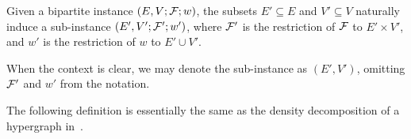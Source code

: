 

\begin{definition}
Given a bipartite instance $(E, V; \mathcal {F}; w)$, the subsets $E' \subseteq E$ and $V' \subseteq V$ naturally induce a sub-instance $(E', V'; \mathcal {F}'; w')$, where $\mathcal {F}'$ is the restriction of $\mathcal {F}$ to $E' \times V'$, and $w'$ is the restriction of $w$ to $E' \cup V'$.

When the context is clear, we may denote the sub-instance as $(E', V')$, omitting $\mathcal {F}'$ and $w'$ from the notation.
\end{definition}


The following definition is essentially the same as the density decomposition of a hypergraph in~\cite{DBLP:conf/www/DanischCS17}. 

